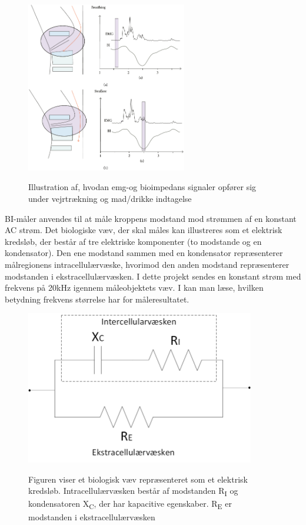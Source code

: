 \begin{figure}[H]
\centering
{\includegraphics[width=7cm]
{Figure/EMGBIGraph}}
\caption{Illustration af, hvodan emg-og bioimpedans signaler opfører sig under vejrtrækning og mad/drikke indtagelse\cite{Schultheiss2014}}
\label{EMGBIGraph} 
\end{figure}
\pagebreak

BI-måler anvendes til at måle kroppens modstand mod strømmen af en konstant AC strøm. Det biologiske væv, der skal måles kan illustreres som et elektrisk kredsløb, der består af tre elektriske komponenter (to modstande og en kondensator). Den ene modstand sammen med en kondensator repræsenterer målregionens intracellulærvæske, hvorimod den anden modstand repræsenterer modstanden i ekstracellulærvæsken. I dette projekt sendes en konstant strøm med frekvens på 20kHz igennem måleobjektets væv. I  kan man læse, hvilken betydning frekvens størrelse har for måleresultatet. 
\begin{figure}[H]
\centering
{\includegraphics[width=10cm]
{Figure/vaevsmodel}}
\caption{Figuren viser et biologisk væv repræsenteret som et elektrisk kredsløb. Intracellulærvæsken består af modstanden  R\textsubscript{I} og kondensatoren X\textsubscript{C}, der har kapacitive egenskaber. R\textsubscript{E} er modstanden i ekstracellulærvæsken}
\label{fig:vaevsmodel}
\end{figure}

